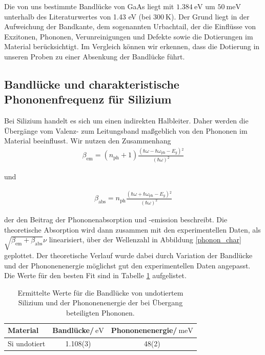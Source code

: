 \documentclass[paper=a4,fontsize=10pt,DIV=18,twocolumn,parskip=half]{scrartcl}
\numberwithin{equation}{section}    %
\begin{document}
Die von uns bestimmte Bandlücke von GaAs liegt mit $\SI{1.384}{\eV}$ um 
$\SI{50}{\milli\eV}$ unterhalb des Literaturwertes von 1.43 eV (bei 
$\SI{300}{\K}$). Der Grund liegt in der Aufweichung der Bandkante, dem 
sogenannten Urbachtail, der die Einflüsse von
Exzitonen, Phononen, Verunreinigungen und Defekte sowie die Dotierungen im 
Material berücksichtigt. Im Vergleich können wir erkennen, dass die Dotierung in 
unseren Proben zu einer Absenkung der Bandlücke führt.

\subsection{Bandlücke und charakteristische Phononenfrequenz für Silizium}

Bei Silizium handelt es sich um einen indirekten Halbleiter. Daher werden die 
Übergänge vom Valenz- zum Leitungsband maßgeblich von den Phononen im Material 
beeinflusst. Wir nutzen den Zusammenhang
\begin{align}
    \beta _{\text{em} }=\left(n_{\text{ph}}+1\right)\frac{\left(\hbar \omega 
    -\hbar \omega _{\text{ph}}-E_g\right){}^2}{(\hbar \omega )^2}
\end{align}

und 

\begin{align}
    \beta _{\text{abs} }=n_{\text{ph}}\frac{\left(\hbar \omega +\hbar \omega 
    _{\text{ph}}-E_g\right){}^2}{(\hbar \omega )^2}
\end{align}

der den Beitrag der Phononenabsorption und \mbox{-emission} beschreibt. Die 
theoretische Absorption wird dann zusammen mit den experimentellen Daten, als 
$\sqrt{\beta _{\text{em} }+\beta _{\text{abs} }}\nu $ linearisiert, über der 
Wellenzahl in Abbildung \ref{phonon_char} geplottet. Der theoretische Verlauf wurde dabei durch 
Variation der Bandlücke und der Phononenenergie möglichst gut den 
experimentellen Daten angepasst. Die Werte für den besten Fit sind in Tabelle \ref{phe} 
aufgelistet.
\begin{table}
    \begin{center}
\begin{tabular}{ l | c c }
  Material & Bandlücke/$\SI{}{\eV}$ & Phononenenergie/$\SI{}{\milli\eV}$\\
  \hline
  Si undotiert & 1.108(3) & 48(2)
\end{tabular}
  \caption{Ermittelte Werte für die Bandlücke von undotiertem Silizium und der 
  Phononenenergie der bei Übergang beteiligten Phononen.}
  \label{phe}
    \end{center}
\end{table}
\end{document}
